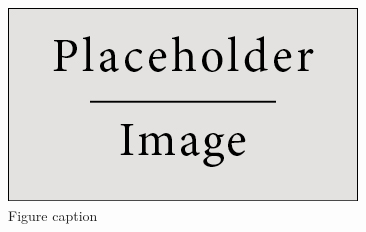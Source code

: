 \documentclass[draft,wrr]{AGUTeX}
\begin{document}
\begin{article}


\end{article}


%
%
%
%
%
%


\newpage

\begin{figure}
\includegraphics[width=0.4\linewidth]{placeholder.jpg}
\caption{Figure caption}\label{placeholder}
\end{figure}
\end{document}
